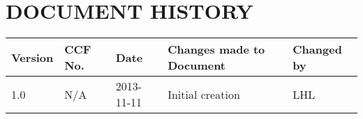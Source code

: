 \documentclass{project}
\begin{document}
\section*{DOCUMENT HISTORY}
\begin{flushleft}
\begin{tabular}{ | p{1.5cm} | p{1cm} | p{2cm} | p{6cm}| p{1.5cm}| }
\hline
Version & CCF No. & Date & Changes made to Document & Changed by \\
\hline

1.0 & N/A & 2013-11-11 & Initial creation & LHL \\
\hline

\end{tabular}
\end{flushleft}
\label{thelastpage}
\end{document}

